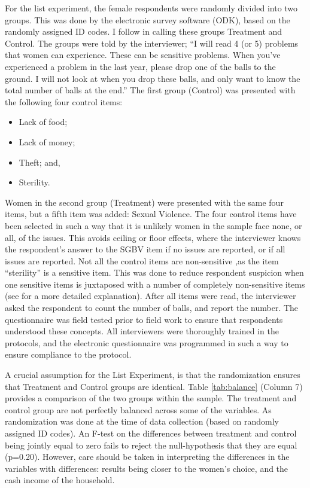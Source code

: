 \documentclass[10pt,a4paper]{scrartcl} %
\begin{document}
For the list experiment, the female respondents were randomly divided into two groups. This was done by the electronic survey software (ODK), based on the randomly assigned ID codes. I follow \cite{Imai2011} in calling these groups Treatment and Control. The groups were told by the interviewer; ``I will read 4 (or 5) problems that women can experience. These can be sensitive problems. When you've experienced a problem in the last year, please drop one of the balls to the ground. I will not look at when you drop these balls, and only want to know the total number of balls at the end.'' The first group (Control) was presented with the following four control items:
\begin{itemize}
	\item Lack of food;
	\item Lack of money;
	\item Theft; and,
	\item Sterility. %
\end{itemize}

Women in the second group (Treatment) were presented with the same four items, but a fifth item was added: Sexual Violence.  The four control items have been selected in such a way that it is unlikely women in the sample face none, or all, of the issues. This avoids ceiling or floor effects, where the interviewer knows the respondent's answer to the SGBV item if no issues are reported, or if all issues are reported. Not all the control items are non-sensitive ,as the item ``sterility'' is a sensitive item. This was done to reduce respondent suspicion when one sensitive items is juxtaposed with a number of completely non-sensitive items (see \citep{Chuang2019} for a more detailed explanation). After all items were read, the interviewer asked the respondent to count the number of balls, and report the number. The questionnaire was field tested prior to field work to ensure that respondents understood these concepts. All interviewers were thoroughly trained in the protocols, and the electronic questionnaire was programmed in such a way to ensure compliance to the protocol.

A crucial assumption for the List Experiment, is that the randomization ensures that Treatment and Control groups are identical. Table \ref{tab:balance} (Column 7) provides a comparison of the two groups within the sample. The treatment and control group are not perfectly balanced across some of the variables. As randomization was done at the time of data collection (based on randomly assigned ID codes). An F-test on the differences between treatment and control being jointly equal to zero fails to reject the null-hypothesis that they are equal (p=0.20). However, care should be taken in interpreting the differences in the variables with differences: results being closer to the women's choice, and the cash income of the household. 
\end{document}
